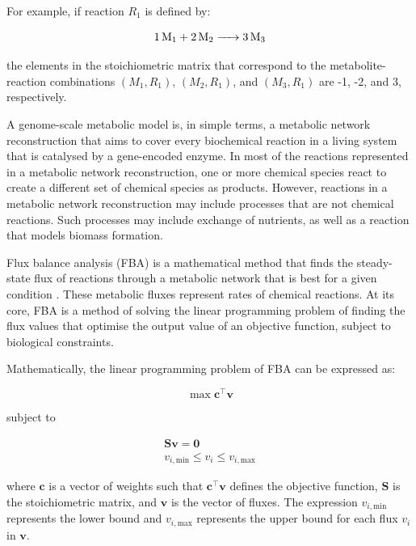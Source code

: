 For example, if reaction $R_{1}$ is defined by:

\begin{equation}
  \ce{1 M1 + 2 M2 -> 3 M3}
  \label{eq:model-example-chemical-reaction}
\end{equation}

the elements in the stoichiometric matrix that correspond to the metabolite-reaction combinations $(M_{1}, R_{1})$, $(M_{2}, R_{1})$, and $(M_{3}, R_{1})$ are -1, -2, and 3, respectively.

A genome-scale metabolic model is, in simple terms, a metabolic network reconstruction that aims to cover every biochemical reaction in a living system that is catalysed by a gene-encoded enzyme.
In most of the reactions represented in a metabolic network reconstruction, one or more chemical species react to create a different set of chemical species as products.
However, reactions in a metabolic network reconstruction may include processes that are not chemical reactions.
Such processes may include exchange of nutrients, as well as a reaction that models biomass formation.

Flux balance analysis (FBA) is a mathematical method that finds the steady-state flux of reactions through a metabolic network that is best for a given condition \parencite{orthWhatFluxBalance2010}.
These metabolic fluxes represent rates of chemical reactions.
At its core, FBA is a method of solving the linear programming problem of finding the flux values that optimise the output value of an objective function, subject to biological constraints.

Mathematically, the linear programming problem of FBA can be expressed as:

\begin{equation}
  \max \mathbf{c}^{\intercal} \mathbf{v}
  \label{eq:model-fba-objective}
\end{equation}

subject to

\begin{equation}
  \begin{gathered}
    \mathbf{S} \mathbf{v} = \mathbf{0}\\
    v_{i,\mathrm{min}} \leq v_{i} \leq v_{i,\mathrm{max}}
  \end{gathered}
  \label{eq:model-fba-constraints}
\end{equation}

where $\mathbf{c}$ is a vector of weights such that $\mathbf{c}^{\intercal} \mathbf{v}$ defines the objective function, $\mathbf{S}$ is the stoichiometric matrix, and $\mathbf{v}$ is the vector of fluxes. The expression $v_{i,\mathrm{min}}$ represents the lower bound and $v_{i,\mathrm{max}}$ represents the upper bound for each flux $v_{i}$ in $\mathbf{v}$.

